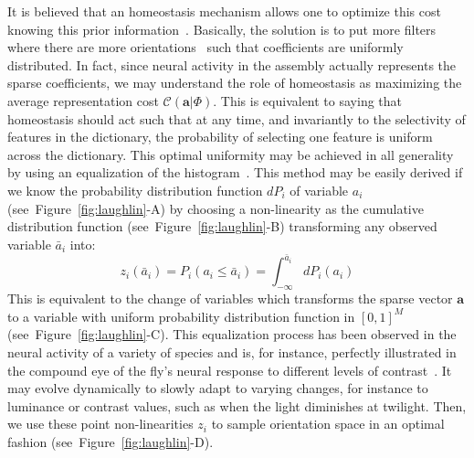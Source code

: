 \documentclass[a4paper, 11pt]{book}
\newcommand{\dico}{\Phi} %
\newcommand{\coef}{\mathbf{a}} %
\newcommand{\seeFig}[1]{Figure~\ref{fig:#1}}%
\begin{document}
It is believed that an homeostasis mechanism allows one to optimize this cost knowing this prior information~\citep{Laughlin81,Perrinet10shl}.
Basically, the solution is to put more filters where there are more orientations~\citep{Ganguli10} such that coefficients are uniformly distributed.
In fact, since neural activity in the assembly actually represents the sparse coefficients, we may understand the role of homeostasis as maximizing the average representation cost $\mathcal{C}( \coef | \dico)$. This is equivalent to saying that homeostasis should act such that at any time, and invariantly to the selectivity of features in the dictionary, the probability of selecting one feature is uniform across the dictionary.
This optimal uniformity may be achieved in all generality by using an equalization of the histogram~\citep{Atick92}. This method may be easily derived if we know the probability distribution function $dP_{i}$ of variable $a_i$  (see~\seeFig{laughlin}-A) by choosing a non-linearity as the cumulative distribution function (see~\seeFig{laughlin}-B) transforming any observed variable $\bar{a}_i$ into:
\begin{equation}
z_i(\bar{a}_i)= P_{i}(a_i \leq \bar{a}_i) = \int_{-\infty}^{\bar{a}_i} dP_{i}(a_i)%
\label{eq:laughlin}%
\end{equation}
This is equivalent to the change of variables which transforms the sparse vector $\coef$ to a variable with uniform probability distribution function in $[0, 1]^M$ (see~\seeFig{laughlin}-C).
This equalization process has been observed in the neural activity of a variety of species and is, for instance, perfectly illustrated  in the compound eye of the fly's neural response to different levels of contrast~\citep{Laughlin81}. It may evolve dynamically to slowly adapt to varying changes, for instance to luminance or contrast values, such as when the light diminishes at twilight.
Then, we use these point non-linearities $z_i$ to sample orientation space in an optimal fashion (see~\seeFig{laughlin}-D). %
\end{document}
